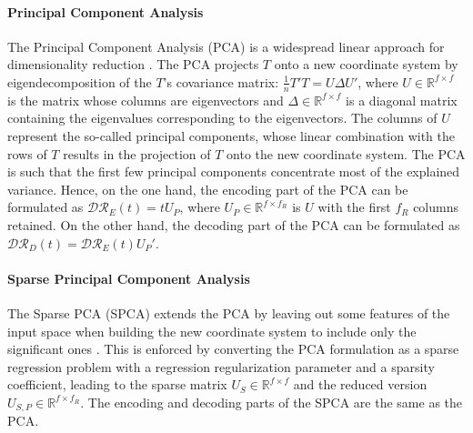 \paragraph{Principal Component Analysis} The Principal Component Analysis (PCA) is a widespread linear approach for dimensionality reduction \cite{abdi2010pca}. The PCA projects $T$ onto a new coordinate system by eigendecomposition of the $T$'s covariance matrix: $\frac{1}{n}T'T=U\Delta U'$, where $U\in\mathbb{R}^{f\times f}$ is the matrix whose columns are eigenvectors and $\Delta\in\mathbb{R}^{f\times f}$ is a diagonal matrix containing the eigenvalues corresponding to the eigenvectors. The columns of $U$ represent the so-called principal components, whose linear combination with the rows of $T$ results in the projection of $T$ onto the new coordinate system. The PCA is such that the first few principal components concentrate most of the explained variance. Hence, on the one hand, the encoding part of the PCA can be formulated as $\mathcal{DR}_E(t)=tU_P$, where $U_P\in\mathbb{R}^{f\times f_R}$ is $U$ with the first $f_R$ columns retained. On the other hand, the decoding part of the PCA can be formulated as $\mathcal{DR}_D(t)=\mathcal{DR}_E(t)U_P'$.

\paragraph{Sparse Principal Component Analysis} The Sparse PCA (SPCA) extends the PCA by leaving out some features of the input space when building the new coordinate system to include only the significant ones \cite{zou2006sparsepca}. This is enforced by converting the PCA formulation as a sparse regression problem with a regression regularization parameter and a sparsity coefficient, leading to the sparse matrix $U_S\in\mathbb{R}^{f\times f}$ and the reduced version $U_{S,P}\in\mathbb{R}^{f\times f_R}$. The encoding and decoding parts of the SPCA are the same as the PCA.

